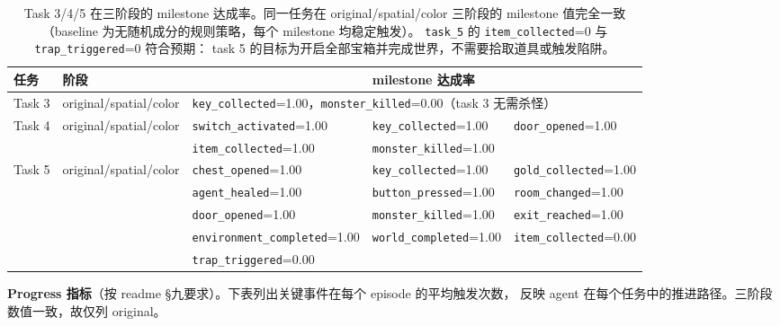\documentclass[12pt,a4paper]{ctexart}
\begin{document}
\begin{table}[H]
\centering
\begin{tabular}{p{}p{}p{}p{}p{}}
\toprule
任务 & 阶段 & \phantom{a} & milestone 达成率 & \phantom{a} \\
\midrule
Task 3 & original/spatial/color & \multicolumn{3}{l}{\texttt{key\_collected}=1.00，\texttt{monster\_killed}=0.00（task 3 无需杀怪）} \\
Task 4 & original/spatial/color & \texttt{switch\_activated}=1.00 & \texttt{key\_collected}=1.00 & \texttt{door\_opened}=1.00 \\
 &  & \texttt{item\_collected}=1.00 & \texttt{monster\_killed}=1.00 & \\
Task 5 & original/spatial/color & \texttt{chest\_opened}=1.00 & \texttt{key\_collected}=1.00 & \texttt{gold\_collected}=1.00 \\
 &  & \texttt{agent\_healed}=1.00 & \texttt{button\_pressed}=1.00 & \texttt{room\_changed}=1.00 \\
 &  & \texttt{door\_opened}=1.00 & \texttt{monster\_killed}=1.00 & \texttt{exit\_reached}=1.00 \\
 &  & \texttt{environment\_completed}=1.00 & \texttt{world\_completed}=1.00 & \texttt{item\_collected}=0.00 \\
 &  & \texttt{trap\_triggered}=0.00 & & \\
\bottomrule
\end{tabular}
\caption{Task 3/4/5 在三阶段的 milestone 达成率。同一任务在 original/spatial/color
三阶段的 milestone 值完全一致（baseline 为无随机成分的规则策略，每个 milestone 均稳定触发）。
\texttt{task\_5} 的 \texttt{item\_collected}=0 与 \texttt{trap\_triggered}=0 符合预期：
task 5 的目标为开启全部宝箱并完成世界，不需要拾取道具或触发陷阱。}
\end{table}

\textbf{Progress 指标}（按 readme §九要求）。下表列出关键事件在每个 episode 的平均触发次数，
反映 agent 在每个任务中的推进路径。三阶段数值一致，故仅列 original。
\end{document}
